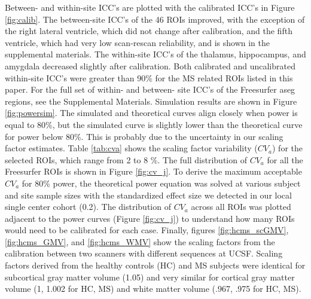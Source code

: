 \documentclass{article}
\begin{document}
Between- and within-site ICC's are plotted with the calibrated ICC's in Figure \ref{fig:calib}. The between-site ICC's of the 46 ROIs improved, with the exception of the right lateral ventricle, which did not change after calibration, and the fifth ventricle, which  had very low scan-rescan reliability, and is shown in the supplemental materials. The within-site ICC's of the thalamus, hippocampus, and amygdala decreased slightly after calibration. Both calibrated and uncalibrated within-site ICC's were greater than 90\% for the MS related ROIs listed in this paper. For the full set of within- and between- site ICC's of the Freesurfer aseg regions, see the Supplemental Materials.
Simulation results are shown in Figure \ref{fig:powersim}. The simulated and theoretical curves align closely when power is equal to 80\%, but the simulated curve is slightly lower than the theoretical curve for power below 80\%. This is probably due to the uncertainty in our scaling factor estimates.
Table \ref{tab:cva} shows the scaling factor variability ($CV_{a}$) for the selected ROIs, which range from 2 to 8 \%. The full distribution of $CV_{a}$ for all the Freesurfer ROIs is shown in Figure \ref{fig:cv_j}. To derive the maximum acceptable $CV_{a}$ for 80\% power, the theoretical power equation was solved at various subject and site sample sizes with the standardized effect size we detected in our local single center cohort (0.2). The distribution of $CV_{a}$ across all ROIs was plotted adjacent to the power curves (Figure \ref{fig:cv_j}) to understand how many ROIs would need to be calibrated for each case. Finally, figures \ref{fig:hcms_scGMV}, \ref{fig:hcms_GMV}, and \ref{fig:hcms_WMV} show the scaling factors from the calibration between two scanners with different sequences at UCSF. Scaling factors derived from the healthy controls (HC) and MS subjects were identical for subcortical gray matter volume (1.05) and very similar for cortical gray matter volume (1, 1.002 for HC, MS) and white matter volume (.967, .975 for HC, MS).
\end{document}
